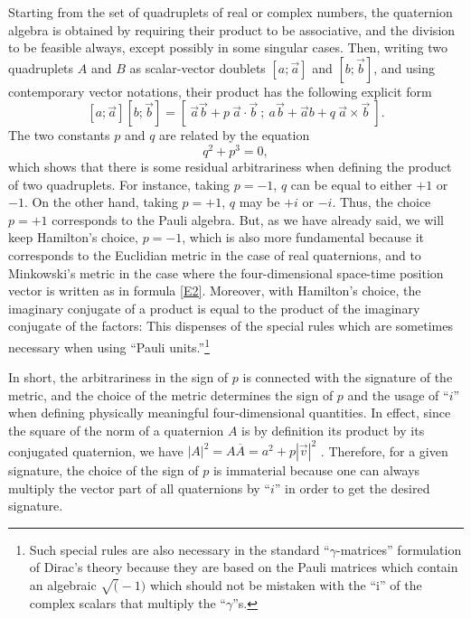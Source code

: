 \documentclass [12pt,a4paper      ]{article}
\newcommand{\CON}{\overline}          %
\begin{document}
     Starting  from  the set of quadruplets of  real  or  complex 
numbers,  the  quaternion algebra is obtained by requiring  their 
product   to  be associative,  and the division to  be   feasible 
always, except possibly in some singular cases. Then, writing two 
quadruplets $A$ and $B$ as scalar-vector doublets $[a;\vec{a}]$ 
and $[b;\vec{b}]$, and using contemporary vector notations, their 
product has the following explicit form
%
\begin{equation}\label{E8}
   [a; \vec{a}] [b; \vec{b}] = 
   [ ~ \vec{a}\vec{b} + p ~ \vec{a}\cdot\vec{b}~ ;
     ~ a\vec{b}  +  \vec{a}b + q ~ \vec{a}\times\vec{b} ~ ]. %
\end{equation}
%
The two constants $p$ and $q$ are related by the equation
%
\begin{equation}\label{E9}
                  q^2  + p^3  = 0,                        %
\end{equation}
%
which  shows  that  there is  some  residual  arbitrariness  when 
defining  the product of two quadruplets.   For instance,  taking 
$p=-1$,  $q$  can  be equal to either $+1$ or $-1$.  On the  other  hand, 
taking  $p=+1$, $q$ may  be $+i$ or $-i$. Thus,  the  choice $p=+1$ 
corresponds to the Pauli algebra.   But, as we have already said, 
we  will keep  Hamilton's  choice, $p=-1$,  which  is  also  more 
fundamental because it corresponds to the Euclidian metric in the 
case of real quaternions,  and to Minkowski's metric in the  case 
where  the four-dimensional space-time position vector is written as 
in formula \eqref{E2}.   Moreover, with Hamilton's choice, the imaginary 
conjugate  of a product is equal to the product of the  imaginary 
conjugate of the factors:  This dispenses of the special rules  which 
are sometimes necessary when using ``Pauli units.''\footnote{Such special rules are also necessary in the standard ``$\gamma$-matrices'' formulation of Dirac's theory because they are based on the Pauli matrices which contain an algebraic $\surd(-1)$  which should not be mistaken with the ``i'' of the complex scalars that multiply the ``$\gamma$''s.}

     In  short,  the arbitrariness in the sign of $p$ is  connected 
with  the signature of the metric,  and the choice of the  metric 
determines  the sign of $p$ and the usage of ``$i$'' when  defining 
physically meaningful four-dimensional quantities.  In effect, since 
the  square of the norm of a quaternion $A$ is by definition  its 
product  by  its  conjugated  quaternion,   we  have   $|A|^2 = A\CON{A}= a^2 + p |\vec{v}|^2$ . Therefore, for a given signature, the choice of the
sign  of $p$ is immaterial because one can  always  multiply  the 
vector part of all quaternions by ``$i$'' in order to get the desired 
signature.
\end{document}
